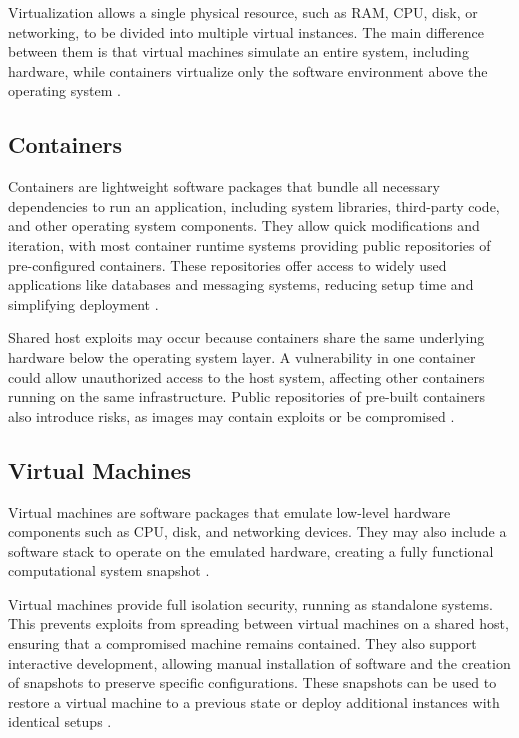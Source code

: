 Virtualization allows a single physical resource, such as RAM, CPU, disk, or networking, to be divided into multiple virtual instances. The main difference between them is that virtual machines simulate an entire system, including hardware, while containers virtualize only the software environment above the operating system \Parencite{atlassian_containers_vs_vms}.

\subsection{Containers}
Containers are lightweight software packages that bundle all necessary dependencies to run an application, including system libraries, third-party code, and other operating system components. They allow quick modifications and iteration, with most container runtime systems providing public repositories of pre-configured containers. These repositories offer access to widely used applications like databases and messaging systems, reducing setup time and simplifying deployment \Parencite{atlassian_containers_vs_vms}.

Shared host exploits may occur because containers share the same underlying hardware below the operating system layer. A vulnerability in one container could allow unauthorized access to the host system, affecting other containers running on the same infrastructure. Public repositories of pre-built containers also introduce risks, as images may contain exploits or be compromised \Parencite{atlassian_containers_vs_vms}.

\subsection{Virtual Machines}
Virtual machines are software packages that emulate low-level hardware components such as CPU, disk, and networking devices. They may also include a software stack to operate on the emulated hardware, creating a fully functional computational system snapshot \Parencite{atlassian_containers_vs_vms}.

Virtual machines provide full isolation security, running as standalone systems. This prevents exploits from spreading between virtual machines on a shared host, ensuring that a compromised machine remains contained. They also support interactive development, allowing manual installation of software and the creation of snapshots to preserve specific configurations. These snapshots can be used to restore a virtual machine to a previous state or deploy additional instances with identical setups \Parencite{atlassian_containers_vs_vms}.

